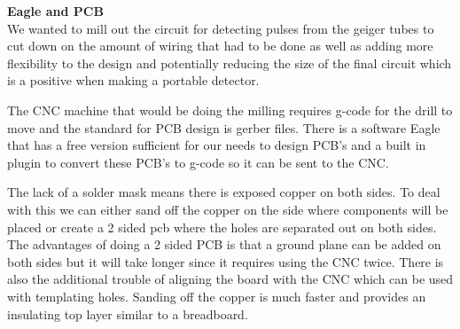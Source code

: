 \documentclass[oneside]{tufte-book}
\newenvironment{loggentry}[2]%
{\noindent\huge{\textbf{#2}}\normalsize\vspace{0.5cm}\marginnote{#1}\\}{\vspace{0.5cm}}
\begin{document}
  \begin{loggentry}{2018-Sep-5}{Eagle and PCB}
    We wanted to mill out the circuit for detecting pulses from the geiger tubes to cut down on the amount of wiring that had to be done as well as adding more flexibility to the design and potentially reducing the size of the final circuit which is a positive when making a portable detector.

    The CNC machine that would be doing the milling requires g-code for the drill to move and the standard for PCB design is gerber files. There is a software Eagle that has a free version sufficient for our needs to design PCB's and a built in plugin to convert these PCB's to g-code so it can be sent to the CNC.

    The lack of a solder mask means there is exposed copper on both sides. To deal with this we can either sand off the copper on the side where components will be placed or create a 2 sided pcb where the holes are separated out on both sides. The advantages of doing a 2 sided PCB is that a ground plane can be added on both sides but it will take longer since it requires using the CNC twice. There is also the additional trouble of aligning the board with the CNC which can be used with templating holes. Sanding off the copper is much faster and provides an insulating top layer similar to a breadboard.
  \end{loggentry}
\end{document}
